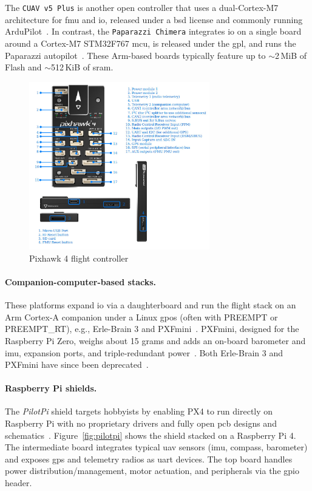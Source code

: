 The \lstinline|CUAV v5 Plus| is another open controller that uses a dual-Cortex-M7 architecture for \gls{fmu} and \gls{io}, released under a \gls{bsd} license and commonly running ArduPilot~\cite{arduPilot-cuavV5}. 
In contrast, the \lstinline|Paparazzi Chimera| integrates \gls{io} on a single board around a Cortex-M7 STM32F767 \gls{mcu}, is released under the \gls{gpl}, and runs the Paparazzi autopilot~\cite{paparazziChimera,paparazzi-github}. 
These Arm-based boards typically feature up to \(\sim\)2\,MiB of Flash and \(\sim\)512\,KiB of \gls{sram}.

\begin{figure}[!hbt]
  \centering
  \includegraphics[width=0.7\textwidth]{./img/jpg/osh-pixhawk4.jpg}
  \caption[Pixhawk 4 flight controller]{Pixhawk 4 flight controller~\cite{pixhawk4}\footnotemark}
  \label{fig:osh-pixhawk4}
\end{figure}

\paragraph{Companion-computer-based stacks.}
These platforms expand \gls{io} via a daughterboard and run the flight stack on an Arm Cortex-A companion under a Linux \gls{gpos} (often with PREEMPT or PREEMPT\_RT), e.g., Erle-Brain 3 and PXFmini~\cite{ebeidUAVPlatformsSurvey2017,erle-brain}. 
PXFmini, designed for the Raspberry Pi Zero, weighs about 15 grams and adds an on-board barometer and \gls{imu}, expansion ports, and triple-redundant power~\cite{pxfmini}. 
Both Erle-Brain 3 and PXFmini have since been deprecated~\cite{pxfmini-deprec}.

\paragraph{Raspberry Pi shields.}
The \emph{PilotPi} shield targets hobbyists by enabling PX4 to run directly on Raspberry Pi with no proprietary drivers and fully open \gls{pcb} designs and schematics~\cite{px4-pilotpi}. 
Figure~\ref{fig:pilotpi} shows the shield stacked on a Raspberry Pi 4. 
The intermediate board integrates typical \gls{uav} sensors (\gls{imu}, compass, barometer) and exposes \gls{gps} and telemetry radios as \gls{uart} devices. 
The top board handles power distribution/management, motor actuation, and peripherals via the \gls{gpio} header.

